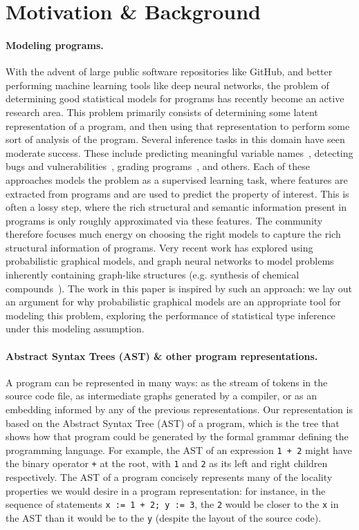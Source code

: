 \section{Motivation \& Background}
\label{sec:motivation}

\paragraph{Modeling programs.}
With the advent of large public software repositories like GitHub, and better performing machine learning tools like deep neural networks, the problem of determining good statistical models for programs has recently become an active research area.
This problem primarily consists of determining some latent representation of a program, and then using that representation to perform some sort of analysis of the program.
Several inference tasks in this domain have seen moderate success.
These include predicting meaningful variable names~\cite{bigcode}, detecting bugs and vulnerabilities~\cite{bugs}, grading programs~\cite{ss}, and others.
Each of these approaches models the problem as a supervised learning task, where features are extracted from programs and are used to predict the property of interest.
This is often a lossy step, where the rich structural and semantic information present in programs is only roughly approximated via these features.
The community therefore focuses much energy on choosing the right models to capture the rich structural information of programs.
Very recent work has explored using probabilistic graphical models, and graph neural networks to model problems inherently containing graph-like structures (e.g. synthesis of chemical compounds~\cite{chemnips}).
The work in this paper is inspired by such an approach: we lay out an argument for why probabilistic graphical models are an appropriate tool for modeling this problem, exploring the performance of statistical type inference under this modeling assumption.

\paragraph{Abstract Syntax Trees (AST) \& other program representations.}
A program can be represented in many ways: as the stream of tokens in the source code file, as intermediate graphs generated by a compiler, or as an embedding informed by any of the previous representations.
Our representation is based on the Abstract Syntax Tree (AST) of a program, which is the tree that shows how that program could be generated by the formal grammar defining the programming language.
For example, the AST of an expression \texttt{1 + 2} might have the binary operator \texttt{+} at the root, with \texttt{1} and \texttt{2} as its left and right children respectively.
The AST of a program concisely represents many of the locality properties we would desire in a program representation: for instance, in the sequence of statements \mbox{\texttt{x := 1 + 2; y := 3}}, the \texttt{2} would be closer to the \texttt{x} in the AST than it would be to the \texttt{y} (despite the layout of the source code).


